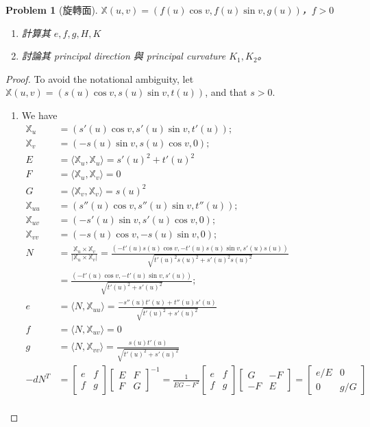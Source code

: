 \documentclass[10pt,a4paper]{article}
\newcounter{theProblemCounter}
\newtheorem{problem}[theProblemCounter]{Problem}
\begin{document}
\setcounter{theProblemCounter}{8}
\begin{problem}[旋轉面]
$\mathbb{X}(u, v)=(f(u)\cos v, f(u)\sin v, g(u))$，$f>0$ \begin{enumerate}
\item[(a)] 計算其 $e, f, g, H, K$
\item[(b)] 討論其 principal direction 與 principal curvature $K_1, K_2$。
\end{enumerate}
\end{problem}
\begin{proof}
To avoid the notational ambiguity, let $\mathbb{X}(u, v)=(s(u)\cos v, s(u)\sin v, t(u))$, and that $s>0$. \begin{enumerate}
\item[(a)] We have
\begin{align*}
\mathbb{X}_u &= (s'(u)\cos v, s'(u)\sin v, t'(u)); \\
\mathbb{X}_v &= (-s(u)\sin v, s(u)\cos v, 0); \\
E &= \langle \mathbb{X}_u, \mathbb{X}_u\rangle = s'(u)^2 + t'(u)^2 \\
F &= \langle \mathbb{X}_u, \mathbb{X}_v\rangle = 0 \\
G &= \langle \mathbb{X}_v, \mathbb{X}_v\rangle = s(u)^2 \\
\mathbb{X}_{uu} &= (s''(u)\cos v, s''(u)\sin v, t''(u)); \\
\mathbb{X}_{uv} &= (-s'(u)\sin v, s'(u)\cos v, 0); \\
\mathbb{X}_{vv} &= (-s(u)\cos v, -s(u)\sin v, 0); \\
N &= \frac{\mathbb{X}_u \times \mathbb{X}_v}{|\mathbb{X}_u \times \mathbb{X}_v|} = \frac{(-t'(u)s(u)\cos v, -t'(u)s(u)\sin v, s'(u)s(u))}{\sqrt{t'(u)^2s(u)^2 + s'(u)^2s(u)^2}} \\
  &= \frac{(-t'(u)\cos v, -t'(u)\sin v, s'(u))}{\sqrt{t'(u)^2 + s'(u)^2}}; \\
e &= \langle N, \mathbb{X}_{uu}\rangle = \frac{-s''(u)t'(u) + t''(u)s'(u)}{\sqrt{t'(u)^2 + s'(u)^2}} \\
f &= \langle N, \mathbb{X}_{uv}\rangle = 0 \\
g &= \langle N, \mathbb{X}_{vv}\rangle = \frac{s(u)t'(u)}{\sqrt{t'(u)^2 + s'(u)^2}} \\
-dN^T &= \left[\begin{array}{cc}e & f \\ f & g\end{array}\right]\left[\begin{array}{cc}E & F \\ F & G\end{array}\right]^{-1} = \frac 1{EG - F^2}\left[\begin{array}{cc}e & f \\ f & g\end{array}\right]\left[\begin{array}{cc}G & -F \\ -F & E\end{array}\right] = \left[\begin{array}{cc}e/E & 0 \\ 0 & g/G\end{array}\right]\\

\end{align*}
\end{enumerate}
\end{proof}
\end{document}
